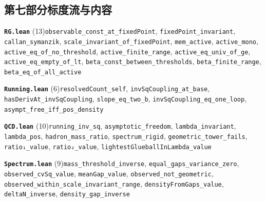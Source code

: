 \documentclass[11pt,a4paper]{article}
\theoremstyle{sudef}
\begin{document}
\subsection*{第七部分\quad 标度流与内容}
\noindent\textbf{\texttt{RG.lean}} (13)\quad \texttt{observable\_\allowbreak const\_\allowbreak at\_\allowbreak fixedPoint}, \texttt{fixedPoint\_\allowbreak invariant}, \texttt{callan\_\allowbreak symanzik}, \texttt{scale\_\allowbreak invariant\_\allowbreak of\_\allowbreak fixedPoint}, \texttt{mem\_\allowbreak active}, \texttt{active\_\allowbreak mono}, \texttt{active\_\allowbreak eq\_\allowbreak of\_\allowbreak no\_\allowbreak threshold}, \texttt{active\_\allowbreak finite\_\allowbreak range}, \texttt{active\_\allowbreak eq\_\allowbreak univ\_\allowbreak of\_\allowbreak ge}, \texttt{active\_\allowbreak eq\_\allowbreak empty\_\allowbreak of\_\allowbreak lt}, \texttt{beta\_\allowbreak const\_\allowbreak between\_\allowbreak thresholds}, \texttt{beta\_\allowbreak finite\_\allowbreak range}, \texttt{beta\_\allowbreak eq\_\allowbreak of\_\allowbreak all\_\allowbreak active}\par\smallskip
\noindent\textbf{\texttt{Running.lean}} (6)\quad \texttt{resolvedCount\_\allowbreak self}, \texttt{invSqCoupling\_\allowbreak at\_\allowbreak base}, \texttt{hasDerivAt\_\allowbreak invSqCoupling}, \texttt{slope\_\allowbreak eq\_\allowbreak two\_\allowbreak b}, \texttt{invSqCoupling\_\allowbreak eq\_\allowbreak one\_\allowbreak loop}, \texttt{asympt\_\allowbreak free\_\allowbreak iff\_\allowbreak pos\_\allowbreak density}\par\smallskip
\noindent\textbf{\texttt{QCD.lean}} (10)\quad \texttt{running\_\allowbreak inv\_\allowbreak sq}, \texttt{asymptotic\_\allowbreak freedom}, \texttt{lambda\_\allowbreak invariant}, \texttt{lambda\_\allowbreak pos}, \texttt{hadron\_\allowbreak mass\_\allowbreak ratio}, \texttt{spectrum\_\allowbreak rigid}, \texttt{geometric\_\allowbreak tower\_\allowbreak fails}, \texttt{ratio₁\_\allowbreak value}, \texttt{ratio₂\_\allowbreak value}, \texttt{lightestGlueballInLambda\_\allowbreak value}\par\smallskip
\noindent\textbf{\texttt{Spectrum.lean}} (9)\quad \texttt{mass\_\allowbreak threshold\_\allowbreak inverse}, \texttt{equal\_\allowbreak gaps\_\allowbreak variance\_\allowbreak zero}, \texttt{observed\_\allowbreak cvSq\_\allowbreak value}, \texttt{meanGap\_\allowbreak value}, \texttt{observed\_\allowbreak not\_\allowbreak geometric}, \texttt{observed\_\allowbreak within\_\allowbreak scale\_\allowbreak invariant\_\allowbreak range}, \texttt{densityFromGaps\_\allowbreak value}, \texttt{deltaN\_\allowbreak inverse}, \texttt{density\_\allowbreak gap\_\allowbreak inverse}\par\smallskip
\end{document}

